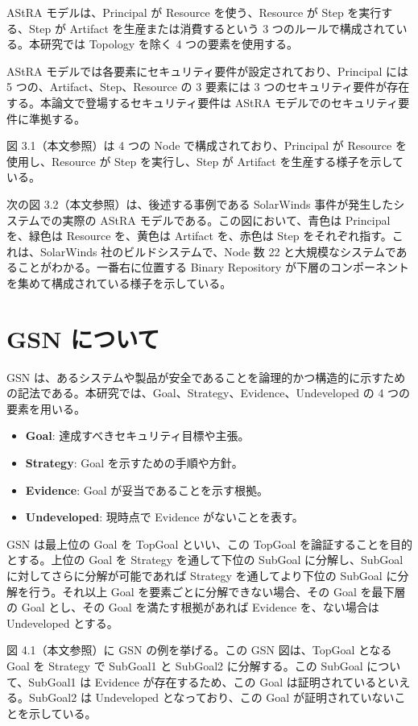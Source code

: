 \documentclass[paper]{ieicej} %
\begin{document}
AStRA モデルは、Principal が Resource を使う、Resource が Step を実行する、Step が Artifact を生産または消費するという 3 つのルールで構成されている。本研究では Topology を除く 4 つの要素を使用する。

AStRA モデルでは各要素にセキュリティ要件が設定されており、Principal には 5 つの、Artifact、Step、Resource の 3 要素には 3 つのセキュリティ要件が存在する。本論文で登場するセキュリティ要件は AStRA モデルでのセキュリティ要件に準拠する。

図 3.1（本文参照）は 4 つの Node で構成されており、Principal が Resource を使用し、Resource が Step を実行し、Step が Artifact を生産する様子を示している。

次の図 3.2（本文参照）は、後述する事例である SolarWinds 事件が発生したシステムでの実際の AStRA モデルである。この図において、青色は Principal を、緑色は Resource を、黄色は Artifact を、赤色は Step をそれぞれ指す。これは、SolarWinds 社のビルドシステムで、Node 数 22 と大規模なシステムであることがわかる。一番右に位置する Binary Repository が下層のコンポーネントを集めて構成されている様子を示している。

\section{GSN について}
GSN は、あるシステムや製品が安全であることを論理的かつ構造的に示すための記法である。本研究では、Goal、Strategy、Evidence、Undeveloped の 4 つの要素を用いる。

\begin{itemize}
    \item \textbf{Goal}: 達成すべきセキュリティ目標や主張。
    \item \textbf{Strategy}: Goal を示すための手順や方針。
    \item \textbf{Evidence}: Goal が妥当であることを示す根拠。
    \item \textbf{Undeveloped}: 現時点で Evidence がないことを表す。
\end{itemize}

GSN は最上位の Goal を TopGoal といい、この TopGoal を論証することを目的とする。上位の Goal を Strategy を通して下位の SubGoal に分解し、SubGoal に対してさらに分解が可能であれば Strategy を通してより下位の SubGoal に分解を行う。それ以上 Goal を要素ごとに分解できない場合、その Goal を最下層の Goal とし、その Goal を満たす根拠があれば Evidence を、ない場合は Undeveloped とする。

図 4.1（本文参照）に GSN の例を挙げる。この GSN 図は、TopGoal となる Goal を Strategy で SubGoal1 と SubGoal2 に分解する。この SubGoal について、SubGoal1 は Evidence が存在するため、この Goal は証明されているといえる。SubGoal2 は Undeveloped となっており、この Goal が証明されていないことを示している。
\end{document}
